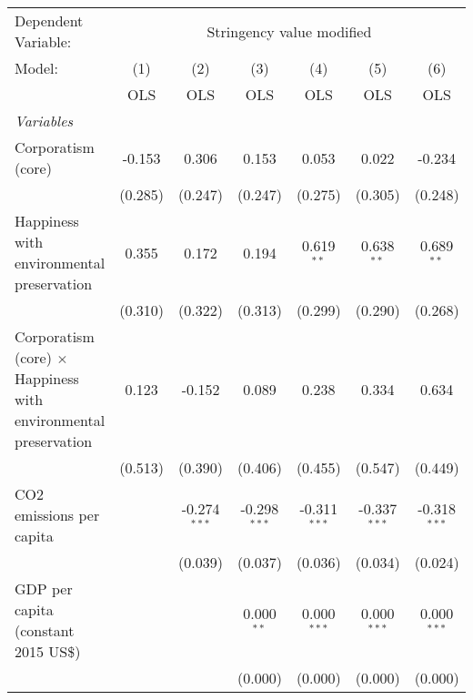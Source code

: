 
\begingroup
\centering
\begin{tabular}{lcccccc}
   \toprule
   Dependent Variable: & \multicolumn{6}{c}{Stringency value modified}\\
   Model:                                                                 & (1)     & (2)            & (3)            & (4)            & (5)            & (6)\\  
                                                                          &  OLS    & OLS            & OLS            & OLS            & OLS            & OLS\\  
   \midrule
   \emph{Variables}\\
   Corporatism (core)                                                     & -0.153  & 0.306          & 0.153          & 0.053          & 0.022          & -0.234\\   
                                                                          & (0.285) & (0.247)        & (0.247)        & (0.275)        & (0.305)        & (0.248)\\   
   Happiness with environmental preservation                              & 0.355   & 0.172          & 0.194          & 0.619$^{**}$   & 0.638$^{**}$   & 0.689$^{**}$\\   
                                                                          & (0.310) & (0.322)        & (0.313)        & (0.299)        & (0.290)        & (0.268)\\   
   Corporatism (core) $\times$ Happiness with environmental preservation  & 0.123   & -0.152         & 0.089          & 0.238          & 0.334          & 0.634\\   
                                                                          & (0.513) & (0.390)        & (0.406)        & (0.455)        & (0.547)        & (0.449)\\   
   CO2 emissions per capita                                               &         & -0.274$^{***}$ & -0.298$^{***}$ & -0.311$^{***}$ & -0.337$^{***}$ & -0.318$^{***}$\\   
                                                                          &         & (0.039)        & (0.037)        & (0.036)        & (0.034)        & (0.024)\\   
   GDP per capita (constant 2015 US\$)                                    &         &                & 0.000$^{**}$   & 0.000$^{***}$  & 0.000$^{***}$  & 0.000$^{***}$\\   
                                                                          &         &                & (0.000)        & (0.000)        & (0.000)        & (0.000)\\   

\end{tabular}
